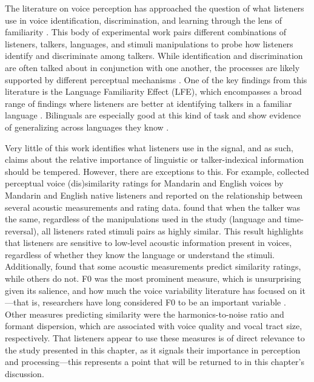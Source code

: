 The literature on voice perception has approached the question of what listeners use in voice identification, discrimination, and learning through the lens of familiarity \citep{levi_2019_methodological, perrachione_2018_recognizing}. This body of experimental work pairs different combinations of listeners, talkers, languages, and stimuli manipulations to probe how listeners identify and discriminate among talkers. While identification and discrimination are often talked about in conjunction with one another, the processes are likely supported by different perceptual mechanisms \citep{perrachione_2019_judgments}. One of the key findings from this literature is the Language Familiarity Effect (LFE), which encompasses a broad range of findings where listeners are better at identifying talkers in a familiar language \citep[for a recent review, see][]{perrachione_2018_recognizing}. Bilinguals are especially good at this kind of task and show evidence of generalizing across languages they know \citep{orena_2019_identifying}. 

Very little of this work identifies what listeners use in the signal, and as such, claims about the relative importance of linguistic or talker-indexical information should be tempered. However, there are exceptions to this. For example, \citet{perrachione_2019_judgments} collected perceptual voice (dis)similarity ratings for Mandarin and English voices by Mandarin and English native listeners and reported on the relationship between several acoustic measurements and rating data. \citet{perrachione_2019_judgments} found that when the talker was the same, regardless of the manipulations used in the study (language and time-reversal), all listeners rated stimuli pairs as highly similar. This result highlights that listeners are sensitive to low-level acoustic information present in voices, regardless of whether they know the language or understand the stimuli. Additionally, \citet{perrachione_2019_judgments} found that some acoustic measurements predict similarity ratings, while others do not. F0 was the most prominent measure, which is unsurprising given its salience, and how much the voice variability literature has focused on it---that is, researchers have long considered F0 to be an important variable \cite[e.g.,][]{keating_2012_f0}. Other measures predicting similarity were the harmonics-to-noise ratio and formant dispersion, which are associated with voice quality and vocal tract size, respectively. That listeners appear to use these measures is of direct relevance to the study presented in this chapter, as it signals their importance in perception and processing---this represents a point that will be returned to in this chapter's discussion.

